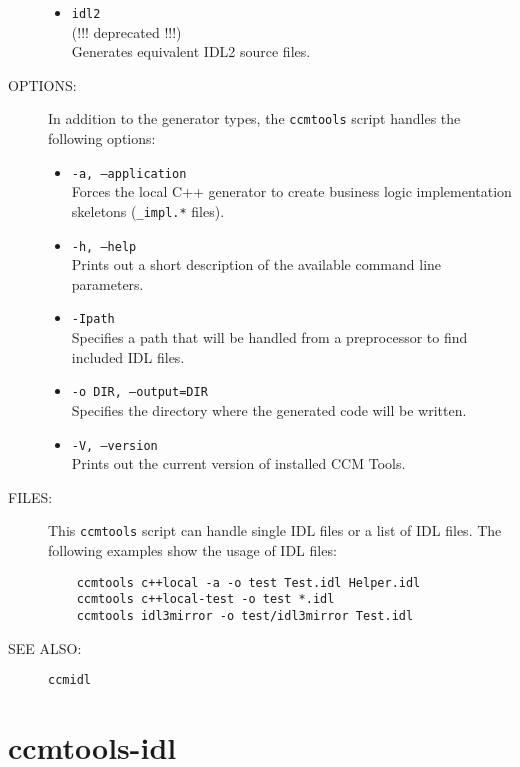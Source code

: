 \begin{description}
\begin{itemize}
  \item {\tt idl2}\\ (!!! deprecated !!!) \\
    Generates equivalent IDL2 source files.
  \end{itemize}
  
\item [OPTIONS:]
  In addition to the generator types, the {\tt ccmtools} script handles
  the following options:
  \begin{itemize}
  \item {\tt -a, --application} \\
    Forces the local C++ generator to create business logic
    implementation skeletons ({\tt *\_impl.*} files).

  \item {\tt -h, --help} \\
    Prints out a short description of the available command line parameters.

  \item {\tt -Ipath} \\
    Specifies a path that will be handled from a preprocessor to find 
    included IDL files.

  \item {\tt -o DIR, --output=DIR} \\
    Specifies the directory where the generated code will be written. 

  \item {\tt -V, --version} \\
    Prints out the current version of installed CCM Tools.
  \end{itemize}
  
\item [FILES:]
  This {\tt ccmtools} script can handle single IDL files or a list of IDL
  files. The following examples show the usage of IDL files: 
  \begin{verbatim}
    ccmtools c++local -a -o test Test.idl Helper.idl 
    ccmtools c++local-test -o test *.idl
    ccmtools idl3mirror -o test/idl3mirror Test.idl
  \end{verbatim}
\item [SEE ALSO:] {\tt ccmidl}
\end{description}




\section{ccmtools-idl}

